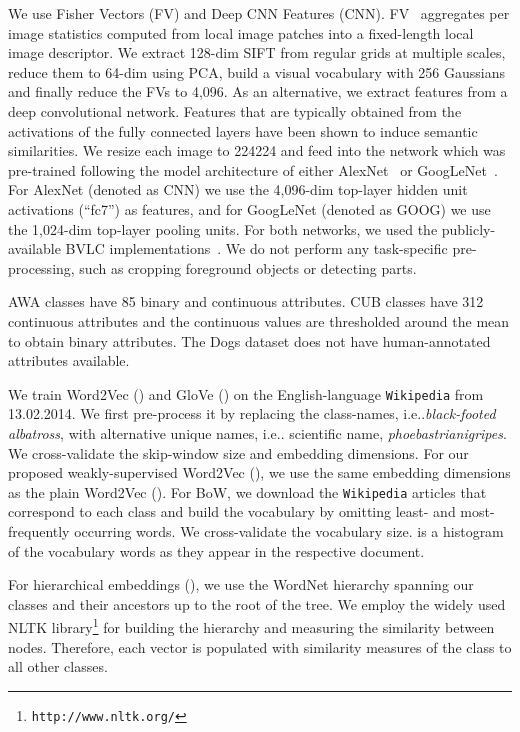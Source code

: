 \documentclass[10pt,twocolumn,letterpaper]{article}
\makeatletter
\newcommand{\myparagraph}[1]{\vspace{2pt}\noindent{\bf #1}}
\DeclareRobustCommand\onedot{\futurelet\@let@token\@onedot}
\def\@onedot{\ifx\@let@token.\else.\null\fi\xspace}
\def\ie{{i.e}\onedot} \def\Ie{{I.e}\onedot}
\makeatother
\begin{document}
\myparagraph{Input Embeddings.} 
We use Fisher Vectors (FV) and Deep CNN Features (CNN). 
FV~\cite{PD07} aggregates per image statistics computed from local image patches into a fixed-length local image descriptor. 
We extract 128-dim SIFT from regular grids at multiple scales, reduce them to 64-dim using PCA, build a visual vocabulary with 256 Gaussians~\cite{VF08} and finally reduce the FVs to 4,096.
As an alternative, we extract features from a deep convolutional network.
Features that are typically obtained from the activations of the fully connected layers have been shown to induce semantic similarities.
We resize each image to 224224 and feed into the network which was pre-trained following the model architecture of either AlexNet~\cite{KSH12} or GoogLeNet~\cite{szegedy2014going,ioffe2015batch}.
For AlexNet (denoted as CNN) we use the 4,096-dim top-layer hidden unit activations (“fc7”) as features, and for GoogLeNet (denoted as GOOG) we use the 1,024-dim top-layer pooling units.
For both networks, we used the publicly-available BVLC implementations~\cite{jia2014caffe}.
We do not perform any task-specific pre-processing, such as cropping foreground objects or detecting parts.


\myparagraph{Output Embeddings.} 
AWA classes have 85 binary and continuous attributes. CUB classes have 312 continuous attributes and the continuous values are thresholded around the mean to obtain binary attributes. 
The Dogs dataset does not have human-annotated attributes available.


We train Word2Vec () and GloVe () on the English-language \texttt{Wikipedia} from 13.02.2014. 
We first pre-process it by replacing the class-names, \ie \emph{black-footed albatross}, with alternative unique names, \ie scientific name, \emph{phoebastrianigripes}.
We cross-validate the skip-window size and embedding dimensions.
For our proposed weakly-supervised Word2Vec (), we use the same embedding dimensions as the plain Word2Vec ().
For BoW, we download the \texttt{Wikipedia} articles that correspond to each class and build the vocabulary by omitting least- and most-frequently occurring words.
We cross-validate the vocabulary size.
 is a histogram of the vocabulary words as they appear in the respective document.


For hierarchical embeddings (), we use the WordNet hierarchy spanning our classes and their ancestors up to the root of the tree.
We employ the widely used NLTK library\footnote{\texttt{http://www.nltk.org/}} for building the hierarchy and measuring the similarity between nodes.
Therefore, each  vector is populated with similarity measures of the class to all other classes.
\end{document}
